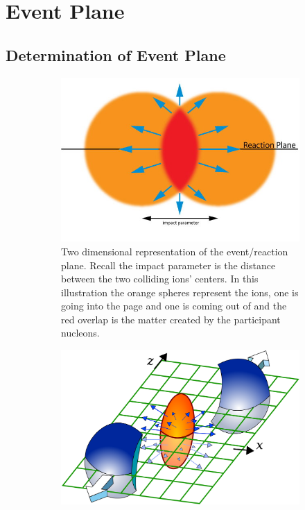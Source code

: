 
\chapter{Event Plane} %

\section{Determination of Event Plane}

\begin{figure}[htbp!]
  \centering
    \begin{subfigure}[p]{0.7\textwidth}
    \includegraphics[width=1\textwidth]{Figures/Flow_Plane.jpg}
    \caption[Diagram showing impact parameter versus $N_spectators$ and $N_participants$]{Two dimensional representation of the event/reaction plane. Recall the impact parameter is the distance between the two colliding ions' centers. In this illustration the orange spheres represent the ions, one is going into the page and one is coming out of and the red overlap is the matter created by the participant nucleons.
    \label{fig:cernfireball}}
    \end{subfigure}
    \begin{subfigure}[p]{0.7\textwidth}
    \includegraphics[width=1\textwidth]{Figures/flowcartoon.jpg}

\end{subfigure}
\end{figure}
